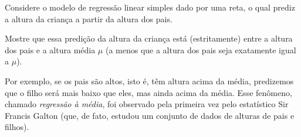 \documentclass[a4paper,12pt]{article}
\begin{document}
\begin{enumerate}
Considere o modelo de regressão linear simples dado por uma reta,  
o qual prediz a altura da criança a partir da altura dos pais.  

Mostre que essa predição da altura da criança está (estritamente) entre a altura dos pais e a altura média $\mu$  
(a menos que a altura dos pais seja exatamente igual a $\mu$).  

Por exemplo, se os pais são altos, isto é, têm altura acima da média,  
predizemos que o filho será mais baixo que eles, mas ainda acima da média.  
Esse fenômeno, chamado \emph{regressão à média}, foi observado pela primeira vez pelo estatístico Sir Francis Galton  
(que, de fato, estudou um conjunto de dados de alturas de pais e filhos).

\end{enumerate}
\end{document}
